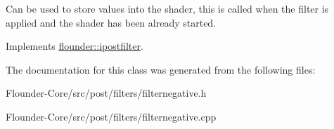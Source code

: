 Can be used to store values into the shader, this is called when the filter is applied and the shader has been already started. 



Implements \hyperlink{classflounder_1_1ipostfilter_a9b658b4672718d5ac36539875bde722e}{flounder\+::ipostfilter}.



The documentation for this class was generated from the following files\+:\begin{DoxyCompactItemize}
\item 
Flounder-\/\+Core/src/post/filters/filternegative.\+h\item 
Flounder-\/\+Core/src/post/filters/filternegative.\+cpp\end{DoxyCompactItemize}
